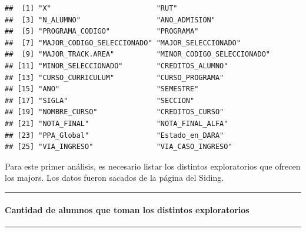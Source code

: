 \documentclass[]{article}
\let\oldparagraph\paragraph
\renewcommand{\paragraph}[1]{\oldparagraph{#1}\mbox{}}
\begin{document}
\begin{verbatim}
##  [1] "X"                         "RUT"                      
##  [3] "N_ALUMNO"                  "ANO_ADMISION"             
##  [5] "PROGRAMA_CODIGO"           "PROGRAMA"                 
##  [7] "MAJOR_CODIGO_SELECCIONADO" "MAJOR_SELECCIONADO"       
##  [9] "MAJOR_TRACK.AREA"          "MINOR_CODIGO_SELECCIONADO"
## [11] "MINOR_SELECCIONADO"        "CREDITOS_ALUMNO"          
## [13] "CURSO_CURRICULUM"          "CURSO_PROGRAMA"           
## [15] "ANO"                       "SEMESTRE"                 
## [17] "SIGLA"                     "SECCION"                  
## [19] "NOMBRE_CURSO"              "CREDITOS_CURSO"           
## [21] "NOTA_FINAL"                "NOTA_FINAL_ALFA"          
## [23] "PPA_Global"                "Estado_en_DARA"           
## [25] "VIA_INGRESO"               "VIA_CASO_INGRESO"
\end{verbatim}

\newline

Para este primer análisis, es necesario listar los distintos
exploratorios que ofrecen los majors. Los datos fueron sacados de la
página del Siding.

\newline
\newline
\newline

\begin{center}\rule{0.5\linewidth}{\linethickness}\end{center}

\paragraph{Cantidad de alumnos que toman los distintos
exploratorios}\label{cantidad-de-alumnos-que-toman-los-distintos-exploratorios}

\begin{center}\rule{0.5\linewidth}{\linethickness}\end{center}
\end{document}
